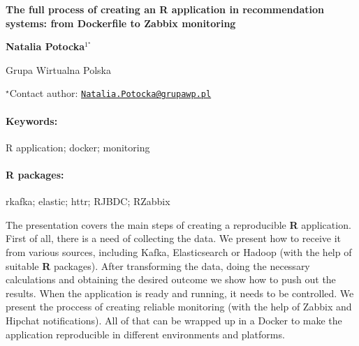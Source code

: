 \documentclass[11pt, a4paper]{article}
\renewcommand{\title}[1]{\begin{center}{\bf \LARGE #1}\end{center}}
\newcommand{\keywords}{\paragraph{Keywords:}}
\newcommand{\packages}{\paragraph{R packages:}}
\begin{document}
\pagestyle{empty}

\title{The full process of creating an R application in recommendation systems:
from Dockerfile to Zabbix monitoring}

\begin{center}
  {\bf Natalia Potocka$^{1^\star}$}
\end{center}

\vskip 0.3cm

\begin{affiliations}
\begin{enumerate}
\begin{minipage}{0.915\textwidth}
\centering
\item Grupa Wirtualna Polska \\[-2pt]
\end{minipage}
\end{enumerate}
$^\star$Contact author: \href{mailto:Natalia.Potocka@grupawp.pl}{\nolinkurl{Natalia.Potocka@grupawp.pl}}\\
\end{affiliations}

\vskip 0.5cm

\begin{minipage}{0.915\textwidth}
\keywords R application; docker; monitoring
\packages rkafka; elastic; httr; RJBDC; RZabbix
\end{minipage}

\vskip 0.8cm

The presentation covers the main steps of creating a reproducible
\textbf{R} application. First of all, there is a need of collecting the
data. We present how to receive it from various sources, including
Kafka, Elasticsearch or Hadoop (with the help of suitable \textbf{R}
packages). After transforming the data, doing the necessary calculations
and obtaining the desired outcome we show how to push out the results.
When the application is ready and running, it needs to be controlled. We
present the proccess of creating reliable monitoring (with the help of
Zabbix and Hipchat notifications). All of that can be wrapped up in a
Docker to make the application reproducible in different environments
and platforms.
\end{document}
